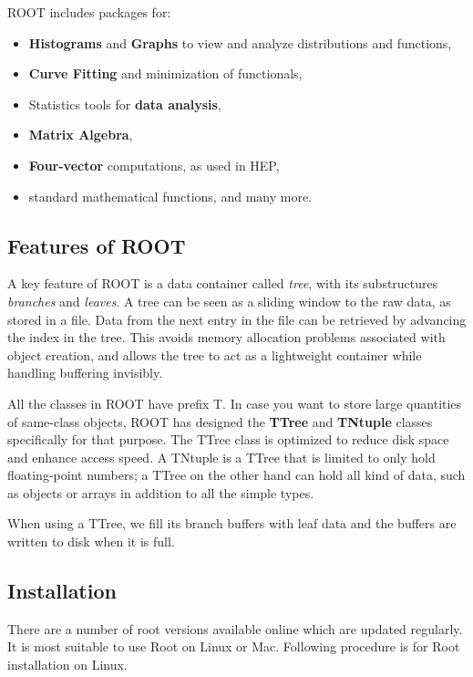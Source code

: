 ROOT includes packages for:
\begin{itemize}
	\item \textbf{Histograms} and \textbf{Graphs} to view and analyze distributions and functions,
	\item \textbf{Curve Fitting}  and minimization of functionals,
	\item Statistics tools for \textbf{data analysis},
	\item \textbf{Matrix Algebra},
	\item \textbf{Four-vector} computations, as used in HEP,
	\item standard mathematical functions, and many more\cite{wiki:1}.
\end{itemize}

\subsection{Features of ROOT}
A key feature of ROOT is a data container called \textit{tree}, with its substructures \textit{branches} and \textit{leaves}. A tree can be seen as a sliding window to the raw data, as stored in a file. Data from the next entry in the file can be retrieved by advancing the index in the tree. This avoids memory allocation problems associated with object creation, and allows the tree to act as a lightweight container while handling buffering invisibly. 

All the classes in ROOT have prefix T. In case you want to store large quantities of same-class objects, ROOT has designed the \textbf{TTree} and \textbf{TNtuple} classes specifically for that purpose. The TTree class is optimized to reduce disk space and enhance access speed. A TNtuple is a TTree that is limited to only hold floating-point numbers; a TTree on the other hand can hold all kind of data, such as objects or arrays in addition to all the simple types. 

When using a TTree, we fill its branch buffers with leaf data and the buffers are written to disk when it is full\cite{wiki:1}.


\subsection{Installation}
There are a number of root versions available online which are updated regularly. It is most suitable to use Root on Linux or Mac. Following procedure is for Root installation on Linux.

